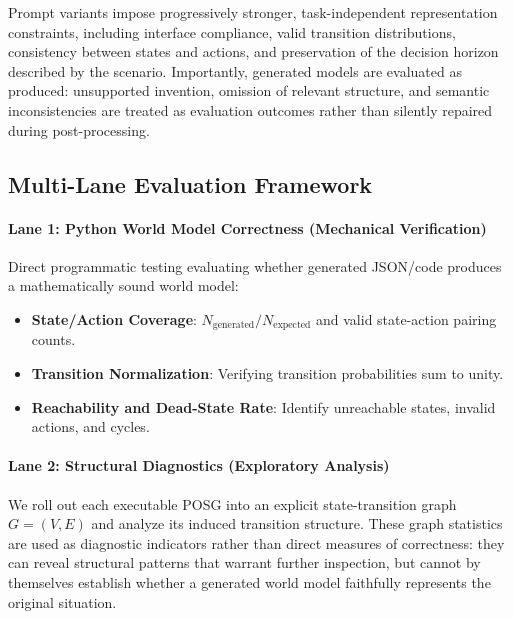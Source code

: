 \documentclass{article}
\begin{document}
Prompt variants impose progressively stronger, task-independent representation constraints, including interface compliance, valid transition distributions, consistency between states and actions, and preservation of the decision horizon described by the scenario. Importantly, generated models are evaluated as produced: unsupported invention, omission of relevant structure, and semantic inconsistencies are treated as evaluation outcomes rather than silently repaired during post-processing.

\subsection{Multi-Lane Evaluation Framework}
\label{subsec:evaluation_framework}

\paragraph{Lane 1: Python World Model Correctness (Mechanical Verification)}
Direct programmatic testing evaluating whether generated JSON/code produces a mathematically sound world model:
\begin{itemize}
    \item \textbf{State/Action Coverage}: $N_{\text{generated}} / N_{\text{expected}}$ and valid state-action pairing counts.
    \item \textbf{Transition Normalization}: Verifying transition probabilities sum to unity.
    \item \textbf{Reachability and Dead-State Rate}: Identify unreachable states, invalid actions, and cycles.
\end{itemize}

\paragraph{Lane 2: Structural Diagnostics (Exploratory Analysis)}
We roll out each executable POSG into an explicit state-transition graph $G=(V,E)$ and analyze its induced transition structure. These graph statistics are used as diagnostic indicators rather than direct measures of correctness: they can reveal structural patterns that warrant further inspection, but cannot by themselves establish whether a generated world model faithfully represents the original situation.
\end{document}
